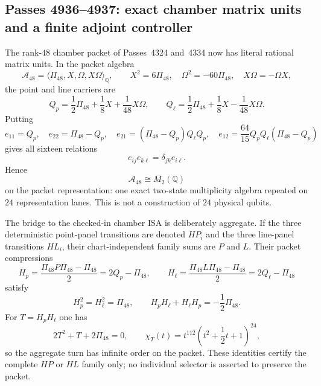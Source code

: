 \subsection{Passes 4936--4937: exact chamber matrix units and a finite adjoint controller}
\label{subsec:pass4936-4937}

The rank-$48$ chamber packet of Passes~4324 and~4334 now has literal rational
matrix units.  In the packet algebra
\[
 \mathcal A_{48}=\langle\Pi_{48},X,\Omega,X\Omega\rangle_{\mathbb Q},
 \qquad X^2=6\Pi_{48},\quad \Omega^2=-60\Pi_{48},\quad
 X\Omega=-\Omega X,
\]
the point and line carriers are
\[
 Q_p=\frac12\Pi_{48}+\frac18X+\frac1{48}X\Omega,
 \qquad
 Q_\ell=\frac12\Pi_{48}+\frac18X-\frac1{48}X\Omega.
\]
Putting
\[
 e_{11}=Q_p,\quad e_{22}=\Pi_{48}-Q_p,\quad
 e_{21}=(\Pi_{48}-Q_p)Q_\ell Q_p,\quad
 e_{12}=\frac{64}{15}Q_pQ_\ell(\Pi_{48}-Q_p)
\]
gives all sixteen relations
\[
 e_{ij}e_{k\ell}=\delta_{jk}e_{i\ell}.
\]
Hence
\[
 \boxed{\mathcal A_{48}\cong M_2(\mathbb Q)}
\]
on the packet representation: one exact two-state multiplicity algebra repeated
on $24$ representation lanes.  This is not a construction of $24$ physical
qubits.

The bridge to the checked-in chamber ISA is deliberately aggregate.  If the
three deterministic point-panel transitions are denoted $HP_i$ and the three
line-panel transitions $HL_i$, their chart-independent family sums are $P$ and
$L$.  Their packet compressions
\[
 H_p=\frac{\Pi_{48}P\Pi_{48}-\Pi_{48}}2=2Q_p-\Pi_{48},
 \qquad
 H_\ell=\frac{\Pi_{48}L\Pi_{48}-\Pi_{48}}2=2Q_\ell-\Pi_{48}
\]
satisfy
\[
 H_p^2=H_\ell^2=\Pi_{48},\qquad
 H_pH_\ell+H_\ell H_p=-\frac12\Pi_{48}.
\]
For $T=H_pH_\ell$ one has
\[
 2T^2+T+2\Pi_{48}=0,\qquad
 \chi_T(t)=t^{112}\left(t^2+\frac12t+1\right)^{24},
\]
so the aggregate turn has infinite order on the packet.  These identities
certify the complete $HP$ or $HL$ family only; no individual selector is
asserted to preserve the packet.

